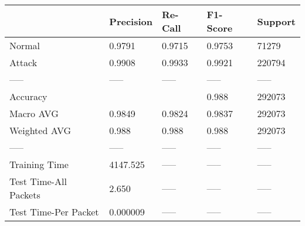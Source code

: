 \begin{tabular}{lllll}
\toprule
{} & Precision & Re-Call & F1-Score & Support \\
\midrule
Normal                &    0.9791 &  0.9715 &   0.9753 &   71279 \\
Attack                &    0.9908 &  0.9933 &   0.9921 &  220794 \\
-----                 &     ----- &   ----- &    ----- &   ----- \\
Accuracy              &           &         &    0.988 &  292073 \\
Macro AVG             &    0.9849 &  0.9824 &   0.9837 &  292073 \\
Weighted AVG          &     0.988 &   0.988 &    0.988 &  292073 \\
-----                 &     ----- &   ----- &    ----- &   ----- \\
Training Time         &  4147.525 &   ----- &    ----- &   ----- \\
Test Time-All Packets &     2.650 &   ----- &    ----- &   ----- \\
Test Time-Per Packet  &  0.000009 &   ----- &    ----- &   ----- \\
\bottomrule
\end{tabular}
